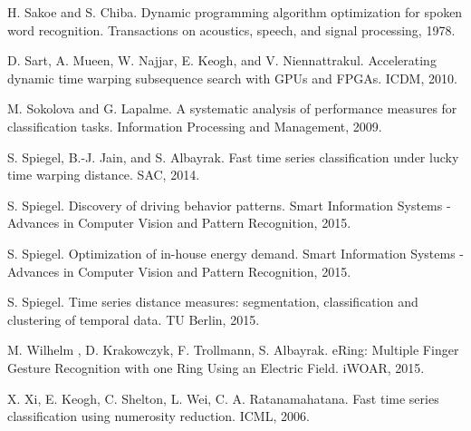 \begin{thebibliography}{11}
    H. Sakoe and S. Chiba. 
    Dynamic programming algorithm optimization for spoken word recognition.
    Transactions on acoustics, speech, and signal processing, 1978.

    D. Sart, A. Mueen, W. Najjar, E. Keogh, and V. Niennattrakul.
	Accelerating dynamic time warping subsequence search with GPUs and FPGAs. 
	ICDM, 2010.

    M. Sokolova and G. Lapalme. 
    A systematic analysis of performance measures for classification tasks.
    Information Processing and Management, 2009.
	
	S. Spiegel, B.-J. Jain, and S. Albayrak. 
	Fast time series classification under lucky time warping distance. 
	SAC, 2014.

	S. Spiegel. 
	Discovery of driving behavior patterns. 
	Smart Information Systems - Advances in Computer Vision and Pattern Recognition, 2015.
	
	S. Spiegel. 
	Optimization of in-house energy demand. 
	Smart Information Systems - Advances in Computer Vision and Pattern Recognition, 2015.
	
	 S. Spiegel. 
	Time series distance measures: segmentation, classification and clustering of temporal data. 
	TU Berlin, 2015.
	
	M. Wilhelm , D. Krakowczyk, F. Trollmann, S. Albayrak.
	eRing: Multiple Finger Gesture Recognition with one Ring Using an Electric Field.
	iWOAR, 2015.
	
	X. Xi, E. Keogh, C. Shelton, L. Wei, C. A. Ratanamahatana.
	Fast time series classification using numerosity reduction. 
	ICML, 2006.           
	
\end{thebibliography}

